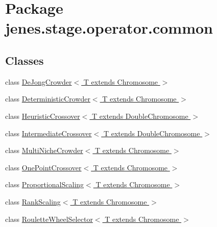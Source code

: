 \hypertarget{namespacejenes_1_1stage_1_1operator_1_1common}{\section{Package jenes.\-stage.\-operator.\-common}
\label{namespacejenes_1_1stage_1_1operator_1_1common}
}
\subsection*{Classes}
\begin{DoxyCompactItemize}
\item 
class \hyperlink{classjenes_1_1stage_1_1operator_1_1common_1_1_de_jong_crowder_3_01_t_01extends_01_chromosome_01_4}{De\-Jong\-Crowder$<$ T extends Chromosome $>$}
\item 
class \hyperlink{classjenes_1_1stage_1_1operator_1_1common_1_1_deterministic_crowder_3_01_t_01extends_01_chromosome_01_4}{Deterministic\-Crowder$<$ T extends Chromosome $>$}
\item 
class \hyperlink{classjenes_1_1stage_1_1operator_1_1common_1_1_heuristic_crossover_3_01_t_01extends_01_double_chromosome_01_4}{Heuristic\-Crossover$<$ T extends Double\-Chromosome $>$}
\item 
class \hyperlink{classjenes_1_1stage_1_1operator_1_1common_1_1_intermediate_crossover_3_01_t_01extends_01_double_chromosome_01_4}{Intermediate\-Crossover$<$ T extends Double\-Chromosome $>$}
\item 
class \hyperlink{classjenes_1_1stage_1_1operator_1_1common_1_1_multi_niche_crowder_3_01_t_01extends_01_chromosome_01_4}{Multi\-Niche\-Crowder$<$ T extends Chromosome $>$}
\item 
class \hyperlink{classjenes_1_1stage_1_1operator_1_1common_1_1_one_point_crossover_3_01_t_01extends_01_chromosome_01_4}{One\-Point\-Crossover$<$ T extends Chromosome $>$}
\item 
class \hyperlink{classjenes_1_1stage_1_1operator_1_1common_1_1_proportional_scaling_3_01_t_01extends_01_chromosome_01_4}{Proportional\-Scaling$<$ T extends Chromosome $>$}
\item 
class \hyperlink{classjenes_1_1stage_1_1operator_1_1common_1_1_rank_scaling_3_01_t_01extends_01_chromosome_01_4}{Rank\-Scaling$<$ T extends Chromosome $>$}
\item 
class \hyperlink{classjenes_1_1stage_1_1operator_1_1common_1_1_roulette_wheel_selector_3_01_t_01extends_01_chromosome_01_4}{Roulette\-Wheel\-Selector$<$ T extends Chromosome $>$}

\end{DoxyCompactItemize}
